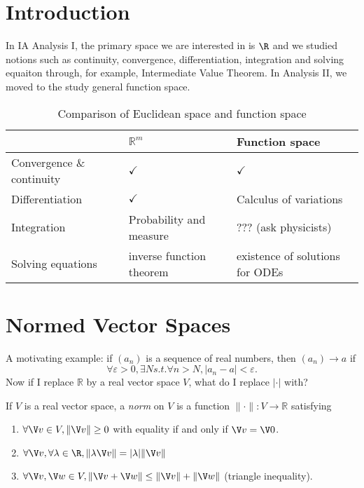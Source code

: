 \documentclass[a4paper]{article}
\theoremstyle{definition}
\begin{document}





\tableofcontents

\setcounter{section}{-1}

\section{Introduction}

In IA Analysis I, the primary space we are interested in is \(\R\) and we studied notions such as continuity, convergence, differentiation, integration and solving equaiton through, for example, Intermediate Value Theorem. In Analysis II, we moved to the study general function space.

\begin{table}[htbp]
  \centering
  \begin{tabular}{|p{}|p{}|p{}|}
    \hline
    & $\mathbb{R}^m$ & Function space \\ \hline
    Convergence \& continuity & $\checkmark$ & $\checkmark$ \\ \hline
    Differentiation & $\checkmark$ & Calculus of variations \\ \hline
    Integration & Probability and measure & ??? (ask physicists) \\ \hline
    Solving equations & inverse function theorem & existence of solutions for ODEs \\ \hline
  \end{tabular}
  \caption{Comparison of Euclidean space and function space}
\end{table}

\section{Normed Vector Spaces}

A motivating example: if $(a_n)$ is a sequence of real numbers, then $(a_n)\to a$ if
\[
  \forall \varepsilon>0,\exists N s.t. \forall n>N, |a_n-a|<\varepsilon.
\]
Now if I replace $\mathbb{R}$ by a real vector space $V$, what do I replace $|\cdot|$ with?

\begin{definition}[Norm]
  If $V$ is a real vector space, a \emph{norm} on $V$ is a function $\|\cdot\|:V\to\mathbb{R}$ satisfying
  \begin{enumerate}
  \item $\forall \V v \in V, \|\V v\| \geq 0$ with equality if and only if $\V v =\V 0$.
  \item $\forall \V v,\forall \lambda \in \R, \|\lambda \V v\| = |\lambda| \|\V v\|$
    \item $\forall \V v,\V w\in V, \|\V v+\V w\| \leq \|\V v\| + \|\V w\|$ (triangle inequality).
  \end{enumerate}
\end{definition}
\end{document}
